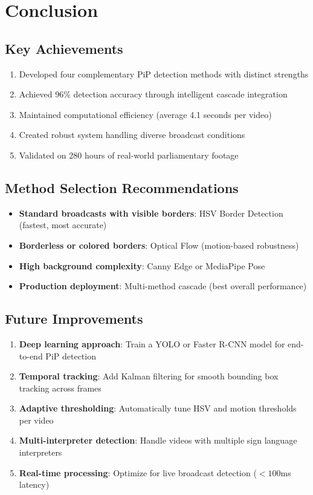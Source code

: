 \documentclass[11pt,a4paper]{article}
\begin{document}
\section{Conclusion}

\subsection{Key Achievements}

\begin{enumerate}
    \item Developed four complementary PiP detection methods with distinct strengths
    \item Achieved 96\% detection accuracy through intelligent cascade integration
    \item Maintained computational efficiency (average 4.1 seconds per video)
    \item Created robust system handling diverse broadcast conditions
    \item Validated on 280 hours of real-world parliamentary footage
\end{enumerate}

\subsection{Method Selection Recommendations}

\begin{itemize}
    \item \textbf{Standard broadcasts with visible borders}: HSV Border Detection (fastest, most accurate)
    \item \textbf{Borderless or colored borders}: Optical Flow (motion-based robustness)
    \item \textbf{High background complexity}: Canny Edge or MediaPipe Pose
    \item \textbf{Production deployment}: Multi-method cascade (best overall performance)
\end{itemize}

\subsection{Future Improvements}

\begin{enumerate}
    \item \textbf{Deep learning approach}: Train a YOLO or Faster R-CNN model for end-to-end PiP detection
    \item \textbf{Temporal tracking}: Add Kalman filtering for smooth bounding box tracking across frames
    \item \textbf{Adaptive thresholding}: Automatically tune HSV and motion thresholds per video
    \item \textbf{Multi-interpreter detection}: Handle videos with multiple sign language interpreters
    \item \textbf{Real-time processing}: Optimize for live broadcast detection ($<100$ms latency)
\end{enumerate}
\end{document}
